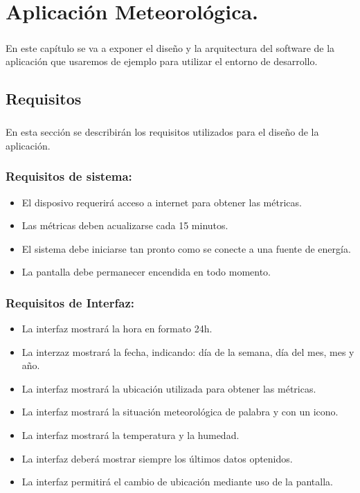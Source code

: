\chapter{Aplicación Meteorológica.}\label{sec:AplicacionMeteorologica}

\paragraph{}En este capítulo se va a exponer el diseño y la arquitectura del software
de la aplicación que usaremos de ejemplo para utilizar el entorno de desarrollo.

\section{Requisitos}

\paragraph{}En esta sección se describirán los requisitos utilizados para el diseño
de la aplicación.

\subsection{Requisitos de sistema:}
\begin{itemize}
    \item El disposivo requerirá acceso a internet para obtener las métricas.
    \item Las métricas deben acualizarse cada 15 minutos.
    \item El sistema debe iniciarse tan pronto como se conecte a una fuente de energía.
    \item La pantalla debe permanecer encendida en todo momento.
\end{itemize}

\subsection{Requisitos de Interfaz:}
\begin{itemize}
    \item La interfaz mostrará la hora en formato 24h.
    \item La interzaz mostrará la fecha, indicando: día de la semana, día del mes, mes y año.
    \item La interfaz mostrará la ubicación utilizada para obtener las métricas.
    \item La interfaz mostrará la situación meteorológica de palabra y con un icono.
    \item La interfaz mostrará la temperatura y la humedad.
    \item La interfaz deberá mostrar siempre los últimos datos optenidos.
    \item La interfaz permitirá el cambio de ubicación mediante uso de la pantalla.
\end{itemize}

